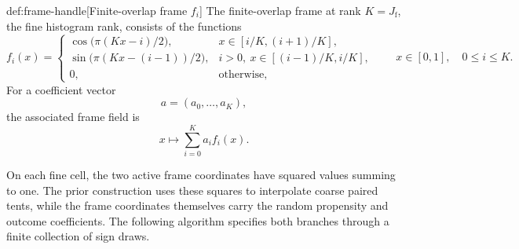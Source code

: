 \documentclass[11pt]{article}
\begin{document}
\begin{definitionv}{def:frame-handle}[Finite-overlap frame \(f_i\)]
The finite-overlap frame at rank \(K=J_{\mathrm f}\), the fine histogram rank, consists of the functions
\[
f_i(x)=
\begin{cases}
\cos\!\bigl(\pi(Kx-i)/2\bigr),
&x\in[i/K,(i+1)/K],\\
\sin\!\bigl(\pi(Kx-(i-1))/2\bigr),
&i>0,\ x\in[(i-1)/K,i/K],\\
0,&\text{otherwise},
\end{cases}
\qquad x\in[0,1],\quad 0\le i\le K.
\]
For a coefficient vector
\[
a=(a_0,\ldots,a_K),
\]
the associated frame field is
\[
x\longmapsto\sum_{i=0}^{K}a_i f_i(x).
\]
\end{definitionv}

On each fine cell, the two active frame coordinates have squared values summing to one. The prior construction uses these squares to interpolate coarse paired tents, while the frame coordinates themselves carry the random propensity and outcome coefficients. The following algorithm specifies both branches through a finite collection of sign draws.
\end{document}
